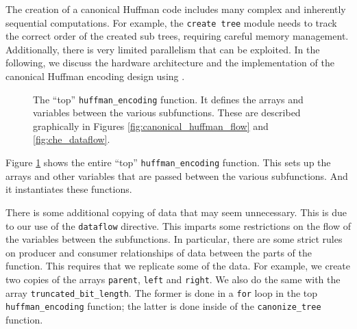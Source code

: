 The creation of a canonical Huffman code includes many complex and inherently sequential computations. For example, the \lstinline{create tree} module needs to track the correct order of the created sub trees, requiring careful memory management. Additionally, there is very limited parallelism that can be exploited. In the following, we discuss the hardware architecture and the implementation of the canonical Huffman encoding design using \VHLS. 

\begin{figure}
{\tiny }
\end{figure}
\begin{figure}
{\tiny }
\caption{  The ``top'' \lstinline{huffman_encoding} function. It defines the arrays and variables  between the various subfunctions.  These are described graphically in Figures \ref{fig:canonical_huffman_flow} and \ref{fig:che_dataflow}.  }
\label{fig:huffman_encoding.cpp}
\end{figure}

Figure \ref{fig:huffman_encoding.cpp} shows the entire ``top'' \lstinline{huffman_encoding} function. This sets up the arrays and other variables that are passed between the various subfunctions. And it instantiates these functions. 

There is some additional copying of data that may seem unnecessary. This is due to our use of the \lstinline{dataflow} directive. This imparts some restrictions on the flow of the variables between the subfunctions. In particular, there are some strict rules on producer and consumer relationships of data between the parts of the function. This requires that we replicate some of the data. For example, we create two copies of the arrays \lstinline{parent}, \lstinline{left} and \lstinline{right}. We also do the same with the array \lstinline{truncated_bit_length}. The former is done in a \lstinline{for} loop in the top \lstinline{huffman_encoding} function; the latter is done inside of the \lstinline{canonize_tree} function.

